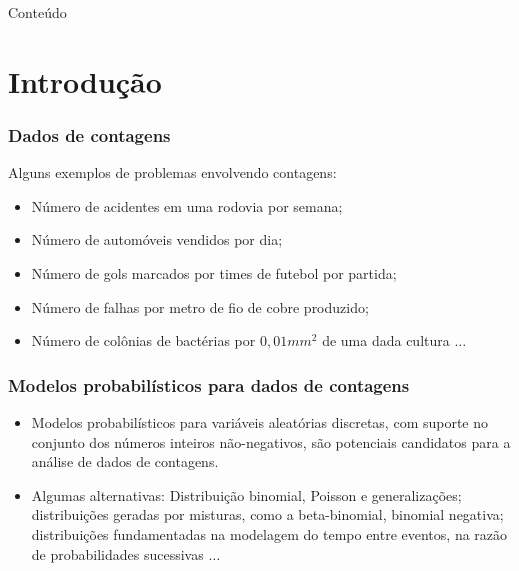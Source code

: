 \documentclass[10pt, aspectratio=169]{beamer}\usepackage[]{graphicx}\usepackage[]{color}
\begin{document}
\begin{frame}{Conteúdo}
\begin{multicols}{2}
  \tableofcontents
\end{multicols}
\end{frame}




\section{Introdução}
\label{intro}

\begin{frame}
\frametitle{Dados de contagens}
Alguns exemplos de problemas envolvendo contagens:

\vspace{0,2cm}
\begin{itemize}
\item Número de acidentes em uma rodovia por semana;
\item Número de automóveis vendidos por dia;
\item Número de gols marcados por times de futebol por partida;
\item Número de falhas por metro de fio de cobre produzido;
\item Número de colônias de bactérias por $0,01mm^{2}$ de uma dada 
cultura $\ldots$

\end{itemize}
\end{frame}

\begin{frame}
\frametitle{Modelos probabilísticos para dados de contagens}

\begin{itemize}
    \item Modelos probabilísticos para variáveis aleatórias discretas, 
    com suporte no conjunto dos números inteiros não-negativos, 
    são potenciais candidatos para a análise de dados de contagens.
\vspace{0.5cm}
    \item Algumas alternativas: Distribuição binomial, Poisson e 
    generalizações; distribuições geradas por misturas, como a 
    beta-binomial, binomial negativa; distribuições fundamentadas na 
    modelagem do tempo entre eventos, na razão de probabilidades 
    sucessivas $\ldots$

\end{itemize}
\end{frame}
\end{document}
